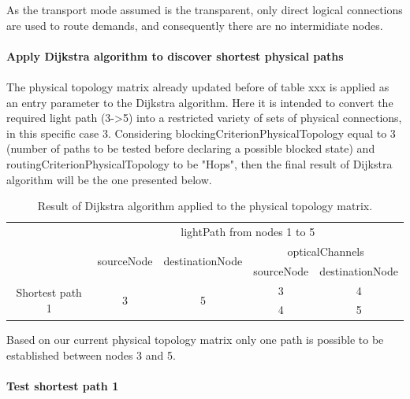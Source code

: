 As the transport mode assumed is the transparent, only direct logical connections are used to route demands, and consequently there are no intermidiate nodes.\\ \\

\textbf{Apply Dijkstra algorithm to discover shortest physical paths}\\ \\
The physical topology matrix already updated before of table xxx is applied as an entry parameter to the Dijkstra algorithm. Here it is intended to convert the required light path (3->5) into a restricted variety of sets of physical connections, in this specific case 3. Considering blockingCriterionPhysicalTopology equal to 3 (number of paths to be tested before declaring a possible blocked state) and routingCriterionPhysicalTopology to be "Hops", then the final result of Dijkstra algorithm will be the one presented below.


\begin{table}[H]
	\centering
\begin{tabular}{c|c|c|c|c|}
	\cline{2-5}
	& \multicolumn{4}{c|}{lightPath from nodes 1 to 5} \\ \cline{2-5} 
	& \multirow{2}{*}{sourceNode} & \multirow{2}{*}{destinationNode} & \multicolumn{2}{c|}{opticalChannels} \\ \cline{4-5} 
	&  &  & sourceNode & destinationNode \\ \cline{2-5} 
	\multirow{2}{*}{Shortest path 1} & \multirow{2}{*}{3} & \multirow{2}{*}{5} & 3 & 4 \\ \cline{4-5} 
	&  &  & 4 & 5 \\ \cline{2-5} 
\end{tabular}
	\caption{Result of Dijkstra algorithm applied to the physical topology matrix.}
\end{table}

Based on our current physical topology matrix only one path is possible to be established between nodes 3 and 5.\\ \\

\textbf{Test shortest path 1}\\ 

